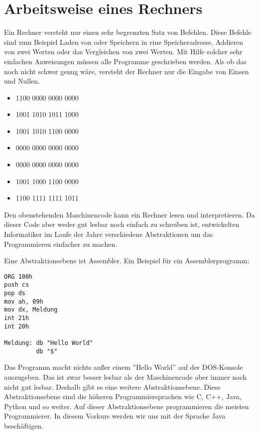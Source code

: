 \section{Arbeitsweise eines Rechners}

Ein Rechner versteht nur einen sehr begrenzten Satz von Befehlen. Diese Befehle sind zum Beispiel Laden von oder Speichern in eine Speicheradresse, Addieren von zwei Werten oder das Vergleichen von zwei Werten. Mit Hilfe solcher sehr einfachen Anweisungen müssen alle Programme geschrieben werden. Als ob das noch nicht schwer genug wäre, versteht der Rechner nur die Eingabe von Einsen und Nullen. 

\begin{itemize}
	\item[]1100 0000 0000 0000
	\item[]1001 1010 1011 1000
	\item[]1001 1010 1100 0000
	\item[]0000 0000 0000 0000
	\item[]0000 0000 0000 0000
	\item[]1001 1000 1100 0000
	\item[]1100 1111 1111 1011
\end{itemize}

Den obenstehenden Maschinencode kann ein Rechner lesen und interpretieren. Da dieser Code aber weder gut lesbar noch einfach zu schreiben ist, entwickelten Informatiker im Laufe der Jahre verschiedene Abstraktionen um das Programmieren einfacher zu machen.

Eine Abstraktionsebene ist Assembler. Ein Beispiel für ein Assemblerprogramm:

\begin{minipage}{\textwidth}
\begin{lstlisting}
ORG 100h 
push cs
pop ds 
mov ah, 09h
mov dx, Meldung 
int 21h
int 20h
 
Meldung: db "Hello World"
         db "$" 
\end{lstlisting}
\end{minipage}

Das Programm macht nichts außer einem ''Hello World'' auf der DOS-Konsole auszugeben. Das ist zwar besser lesbar als der Maschinencode aber immer noch nicht gut lesbar. Deshalb gibt es eine weitere Abstraktionsebene. Diese Abstraktionsebene sind die höheren Programmiersprachen wie C, C++, Java, Python und so weiter. Auf dieser Abstraktionsebene programmieren die meisten Programmierer. In diesem Vorkurs werden wir uns mit der Sprache Java beschäftigen.
